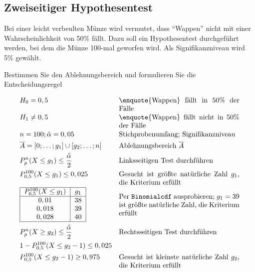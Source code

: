 \documentclass[10pt]{article}
\begin{document}
\subsection{Zweiseitiger Hypothesentest}
\begin{example}
Bei einer leicht verbeulten Münze wird vermutet, dass \enquote{Wappen} nicht mit einer
Wahrscheinlichkeit von 50\% fällt. Dazu soll ein Hypothesentest durchgeführt werden, bei dem
die Münze 100-mal geworfen wird. Als Signifikanzniveau wird 5\% gewählt.

Bestimmen Sie den Ablehnungsbereich und formulieren Sie die Entscheidungsregel

\addtolength{\jot}{1em}
\begin{align*}
&H_0 = 0,5 &\parbox[t]{0.5\linewidth}{\enquote{Wappen} fällt in 50\% der Fälle} \\
&H_1 \neq 0,5 &\parbox[t]{0.5\linewidth}{\enquote{Wappen} fällt nicht in 50\% der Fälle} \\
&n = 100; \hat\alpha = 0,05 &\parbox[t]{0.5\linewidth}{Stichprobenumfang; Signifikanzniveau} \\
&\overline A = [0;\dots;g_1] \cup [g_2;\dots;n] &\parbox[t]{0.5\linewidth}{Ablehnungsbereich $\overline A$} \\
&P^n_p(X \leq g_1) \leq \frac{\hat\alpha}{2} &\parbox[t]{0.5\linewidth}{Linksseitigen Test durchführen} \\
&P^{100}_{0,5}(X \leq g_1) \leq 0,025 &\parbox[t]{0.5\linewidth}{Gesucht ist größte natürliche Zahl $g_1$, die Kriterium erfüllt} \\
& \begin{tabular}{|c|c|}
	\hline
	$P^{100}_{0,5}(X \leq g_1)$ & $g_1$ \\ \hline
	$0,01$ & $38$ \\
	$0,018$ & $39$ \\
	$0,028$ & $40$ \\
	\hline
	\end{tabular} &\parbox{0.5\linewidth}{Per \texttt{Binomialcdf} ausprobieren; $g_1 = 39$ ist größte natürliche Zahl, die Kriterium erfüllt}\\
&P^n_p(X \geq g_2) \leq \frac{\hat\alpha}{2} &\parbox[t]{0.5\linewidth}{Rechtsseitigen Test durchführen} \\
&1 - P^{100}_{0,5}(X \leq g_2 - 1) \leq 0,025 &\parbox[t]{0.5\linewidth}{} \\
&P^{100}_{0,5}(X \leq g_2 - 1) \geq 0,975 &\parbox[t]{0.5\linewidth}{Gesucht ist kleinste natürliche Zahl $g_2$, die Kriterium erfüllt} \\

\end{align*}
\end{example}
\end{document}
